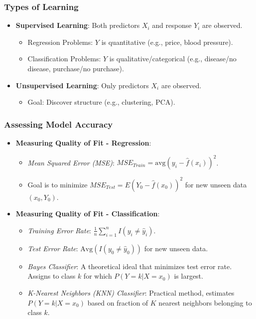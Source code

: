 \documentclass[12pt,a4paper]{article}
\begin{document}
    \subsubsection{Types of Learning}
        \begin{itemize}
            \item \textbf{Supervised Learning}: Both predictors $X_i$ and response $Y_i$ are observed.
                \begin{itemize}
                    \item Regression Problems: $Y$ is quantitative (e.g., price, blood pressure).
                    \item Classification Problems: $Y$ is qualitative/categorical (e.g., disease/no disease, purchase/no purchase).
                \end{itemize}
            \item \textbf{Unsupervised Learning}: Only predictors $X_i$ are observed.
                \begin{itemize}
                    \item Goal: Discover structure (e.g., clustering, PCA).
                \end{itemize}
        \end{itemize}

    \subsubsection{Assessing Model Accuracy }
        \begin{itemize}
            \item \textbf{Measuring Quality of Fit - Regression}:
                \begin{itemize}
                    \item \textit{Mean Squared Error (MSE)}: $MSE_{Train} = \text{avg}(y_i - \hat{f}(x_i))^2$.
                    \item Goal is to minimize $MSE_{Test} = E(Y_0 - \hat{f}(x_0))^2$ for new unseen data $(x_0, Y_0)$.
                \end{itemize}
            \item \textbf{Measuring Quality of Fit - Classification}:
                \begin{itemize}
                    \item \textit{Training Error Rate}: $\frac{1}{n} \sum_{i=1}^{n} I(y_i \neq \hat{y}_i)$.
                    \item \textit{Test Error Rate}: $\text{Avg}(I(y_0 \neq \hat{y}_0))$ for new unseen data.
                    \item \textit{Bayes Classifier}: A theoretical ideal that minimizes test error rate. Assigns to class $k$ for which $P(Y=k|X=x_0)$ is largest.
                    \item \textit{K-Nearest Neighbors (KNN) Classifier}: Practical method, estimates $P(Y=k|X=x_0)$ based on fraction of $K$ nearest neighbors belonging to class $k$.
                \end{itemize}
        \end{itemize}
\end{document}
